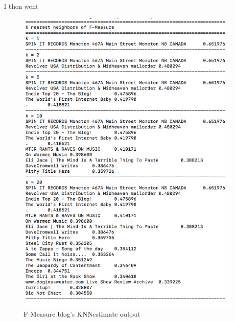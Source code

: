 \documentclass[letterpaper,11pt]{article}
\newcommand*{\srcPath}{../src}%
\begin{document}
I then went





\clearpage
 \begin{figure}[h]
 \centering
 \includegraphics[scale=0.6]{fmeasureknn.png}
 \caption{F-Measure blog's KNNestimate output}
 \label{fig:q1knnout}
 \end{figure}
\end{document}
